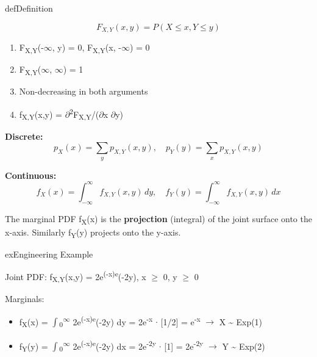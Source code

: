 
\begin{PSbox}[unbreakable]{def}{Definition}

\[F_{X,Y}(x,y) = P(X \leq x, Y \leq y)\]

\end{PSbox}


\begin{enumerate}
\def\labelenumi{\arabic{enumi}.}
\tightlist
\item
  F\textsubscript{X,Y}(-\ensuremath{\infty}, y) = 0, F\textsubscript{X,Y}(x, -\ensuremath{\infty}) = 0
\item
  F\textsubscript{X,Y}(\ensuremath{\infty}, \ensuremath{\infty}) = 1
\item
  Non-decreasing in both arguments
\item
  f\textsubscript{X,Y}(x,y) = \ensuremath{\partial}\textsuperscript{2}F\textsubscript{X,Y}/(\ensuremath{\partial}x \ensuremath{\partial}y)
\end{enumerate}



\textbf{Discrete:}\PSbr{}\[p_X(x) = \sum_y p_{X,Y}(x,y), \quad p_Y(y) = \sum_x p_{X,Y}(x,y)\]

\textbf{Continuous:}\PSbr{}\[f_X(x) = \int_{-\infty}^{\infty} f_{X,Y}(x,y) \, dy, \quad f_Y(y) = \int_{-\infty}^{\infty} f_{X,Y}(x,y) \, dx\]


The marginal PDF f\textsubscript{X}(x) is the \textbf{projection} (integral) of the joint surface onto the x-axis. Similarly f\textsubscript{Y}(y) projects onto the y-axis.

\begin{PSbox}[unbreakable]{ex}{Engineering Example}

Joint PDF: f\textsubscript{X,Y}(x,y) = 2e\textsuperscript{(-x)e}(-2y), x \ensuremath{\ge} 0, y \ensuremath{\ge} 0

Marginals:

\begin{itemize}
\tightlist
\item
  f\textsubscript{X}(x) = \ensuremath{\int}\textsubscript{0}\textsuperscript{\ensuremath{\infty}} 2e\textsuperscript{(-x)e}(-2y) dy = 2e\textsuperscript{-x} \ensuremath{\cdot} [1/2] = e\textsuperscript{-x} \ensuremath{\to} X \textasciitilde{} Exp(1)
\item
  f\textsubscript{Y}(y) = \ensuremath{\int}\textsubscript{0}\textsuperscript{\ensuremath{\infty}} 2e\textsuperscript{(-x)e}(-2y) dx = 2e\textsuperscript{-2y} \ensuremath{\cdot} [1] = 2e\textsuperscript{-2y} \ensuremath{\to} Y \textasciitilde{} Exp(2)
\end{itemize}

\end{PSbox}

